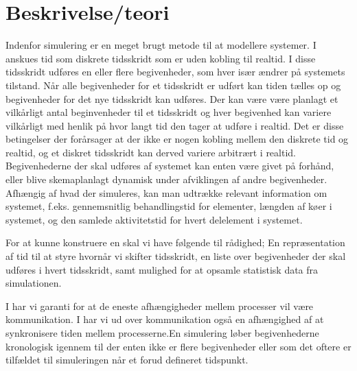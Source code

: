 \section{Beskrivelse/teori} \label{sec:des-teori}

\begin{shaded}
Indenfor simulering er \des en meget brugt metode til at modellere systemer. I 
\des anskues tid som diskrete tidsskridt som er uden kobling til realtid. I 
disse tidsskridt udføres en eller flere begivenheder, som hver især ændrer på systemets tilstand. Når alle begivenheder for et tidsskridt er udført kan tiden tælles op og begivenheder for det nye tidsskridt kan udføres. Der kan være være planlagt et vilkårligt antal beginvenheder til et tidsskridt og hver begivenhed kan variere vilkårligt med henlik på hvor langt tid den tager at udføre i realtid. Det er disse betingelser der forårsager at der ikke er nogen kobling mellem den diskrete tid og realtid, og et diskret tidsskridt kan derved variere arbitrært i realtid. Begivenhederne der skal udføres af systemet kan enten være givet på forhånd, eller blive skemaplanlagt dynamisk under afviklingen af andre begivenheder. 
Afhængig af hvad der simuleres, kan man udtrække relevant information om systemet, f.eks. gennemsnitlig behandlingstid for elementer, længden af køer i systemet, og den samlede aktivitetstid for hvert delelement i systemet.


For at kunne konstruere en \des skal vi have følgende til rådighed; En repræsentation af tid til at styre hvornår vi skifter tidsskridt, en liste over begivenheder der skal udføres i hvert tidsskridt, samt mulighed for at opsamle statistisk data fra simulationen. 

    
I \csp har vi garanti for at de eneste afhængigheder mellem processer vil være kommunikation. I \des har vi ud over kommunikation også en afhængighed af at synkronisere tiden mellem processerne.En simulering løber begivenhederne kronologisk igennem til der enten ikke er flere begivenheder eller som det oftere er tilfældet til simuleringen når et forud defineret tidspunkt.

\end{shaded}
